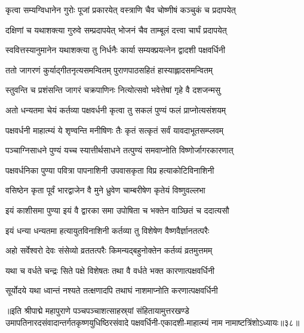 \twolineshloka
{कृत्वा सम्यग्विधानेन गुरोः पूजां प्रकारयेत्}
{वस्त्राणि चैव चोष्णीषं कञ्चुकं च प्रदापयेत्}%

\twolineshloka
{दक्षिणां च यथाशक्त्या गुरुवे सम्प्रदापयेत् }
{भोजनं चैव ताम्बूलं दत्त्वा चार्घं प्रदापयेत्}%

\twolineshloka
{स्ववित्तस्यानुमानेन यथाशक्त्या तु निर्धनैः}
{कार्या सम्यक्प्रयत्नेन द्वादशी पक्षवर्धिनी}%

\twolineshloka
{ततो जागरणं कुर्याद्गीतनृत्यसमन्वितम्}
{पुराणपाठसहितं हास्याह्लादसमन्वितम्}%

\twolineshloka
{स्तुवन्ति च प्रशंसन्ति जागरं चक्रपाणिनः}
{नित्योत्सवो भवेत्तेषां गृहे वै दशजन्मसु}%

\twolineshloka
{अतो धन्यतमा चेयं कर्तव्या पक्षवर्धनी}
{कृत्वा तु सकलं पुण्यं फलं प्राप्नोत्यसंशयम्}%

\twolineshloka
{पक्षवर्धनी माहात्म्यं ये शृण्वन्ति मनीषिणः}
{तैः कृतं सत्कृतं सर्वं यावदाभूतसम्प्लवम्}%

\twolineshloka
{पञ्चाग्निसाधने पुण्यं यच्च स्यात्तीर्थसाधने}
{तत्पुण्यं समवाप्नोति विष्णोर्जागरकारणात्}%

\twolineshloka
{पक्षवर्धनिका पुण्या पवित्रा पापनाशिनी}
{उपवासकृता विप्र हत्याकोटिविनाशिनी}%

\twolineshloka
{वसिष्ठेन कृता पूर्वं भारद्वाजेन वै मुने}
{ध्रुवेण चाम्बरीषेण कृतेयं विष्णुवल्लभा}%

\twolineshloka
{इयं काशीसमा पुण्या इयं वै द्वारका समा}
{उपोषिता च भक्तेन वाञ्छितं च ददात्यसौ}%

\twolineshloka
{इयं धन्या धन्यतमा हत्यायुतविनाशिनी}
{कर्तव्या तु विशेषेण वैष्णवैर्ज्ञानतत्परैः}%

\twolineshloka
{अहो सर्वेश्वरो देवः संसेव्यो व्रततत्परैः}
{किमन्यद्बहुनोक्तेन कर्तव्यं व्रतमुत्तमम्}%

\twolineshloka
{यथा च वर्धते चन्द्रः सिते पक्षे विशेषतः}
{तथा वै वर्धते भक्त कारणात्पक्षवर्धिनी}%

\twolineshloka
{सूर्योदये यथा ध्वान्तं नश्यते तत्क्षणादपि}
{तथाघं नाशमाप्नोति करणात्पक्षवर्धिनी}%

॥इति श्रीपाद्मे महापुराणे पञ्चपञ्चाशत्साहस्र्यां संहितायामुत्तरखण्डे उमापतिनारदसंवादान्तर्गतकृष्णयुधिष्ठिरसंवादे पक्षवर्धिनी-एकादशी-माहात्म्यं नाम नामाष्टत्रिंशोऽध्यायः॥३८॥


\hyperref[sec:ekadashi_mahatmyam_padma_puranam]{\closesub}
\clearpage

\label{sec:padma-jagaranamahima}


